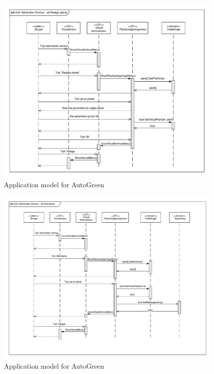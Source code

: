 \clearpage

\begin{figure}[!h]
\centering 
\includegraphics[width={\textwidth-1cm}, trim=0 0 0 0, clip=true] {../fig/SD_autoGreen_UC_4_Administrerdrivhus_alt_redigerplante.pdf}
\caption{Application model for AutoGreen}
\label{fig:SD_UC1_alt1}
\end{figure}

\clearpage

\begin{figure}[!h]
\centering 
\includegraphics[width={\textwidth-1cm}, trim=0 0 0 0, clip=true] {../fig/SD_autoGreen_UC_4_Administrerdrivhus_alt_sletplante.pdf}
\caption{Application model for AutoGreen}
\label{fig:SD_UC1_alt2}
\end{figure}

